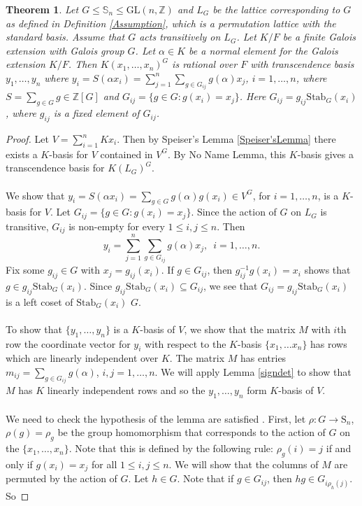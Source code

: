 \documentclass{article}
\theoremstyle{plain}
\newtheorem{theorem}{Theorem}
\theoremstyle{definition}
\newcommand{\Z}{\ensuremath{\mathbb{Z}}}
\begin{document}
\begin{theorem}
Let $G\leq \mathbb{S}_n \leq \mathrm{GL}(n,\Z)$ and $L_G$ be the lattice corresponding to $G$ as defined in Definition \ref{Assumption}, which is a permutation lattice with the standard basis. Assume that $G$ acts transitively on $L_G$. Let $K/F$ be a finite Galois extension with Galois group $G$. Let $\alpha \in K$ be a normal element for the Galois extension $K/F$. Then $ K(x_1,\ldots , x_n)^G$ is rational over $F$ with transcendence basis $y_1, \ldots , y_n$ where $y_i = S(\alpha x_i) = \sum^n_{j=1}\sum_{g \in G_{ij}}g(\alpha)x_j$, $i = 1, \ldots , n$, where $S = \sum_{g\in G} g \in \Z[G]$ and $G_{ij} = \lbrace g \in G : g(x_i) = x_j \rbrace$. Here $G_{ij}=g_{ij}\mathrm{Stab}_{G}(x_i)$, where $g_{ij}$ is a fixed element of $G_{ij}$. 
\end{theorem}
\begin{proof}
Let $V = \sum_{i=1}^n Kx_i$. Then by Speiser's Lemma \ref{Speiser'sLemma} there exists a $K$-basis for $V$ contained in $V^G$. By No Name Lemma, this $K$-basis gives a transcendence basis for $K(L_G)^G$.\\
\\
We show that $y_i = S(\alpha x_i) = \sum_{g \in G} g(\alpha)g(x_i) \in V^G$, for $i = 1, \ldots , n$, is a $K$-basis for $V$. Let $G_{ij}= \lbrace g \in G: g(x_i) = x_j \rbrace$. Since the action of $G$ on $L_G$ is transitive, $G_{ij}$ is non-empty for every $1 \leq i,j \leq n$. Then $$y_i = \sum^n_{j =1}\sum_{g \in G_{ij}}g(\alpha)x_j, \,\,\, i = 1, \ldots, n.$$
Fix some $g_{ij} \in G$ with $x_j = g_{ij}(x_i)$. If $g \in G_{ij}$, then $g^{-1}_{ij}g(x_i) = x_i$ shows that $g \in g_{ij}\mathrm{Stab}_G(x_i)$. Since  $g_{ij}\mathrm{Stab}_G(x_i) \subseteq G_{ij}$, we see that $G_{ij} = g_{ij}\mathrm{Stab}_G(x_i)$ is a left coset of $\mathrm{Stab}_G(x_i)$ $G$.\\
\\
To show that $\lbrace y_1, \ldots, y_n \rbrace$ is a $K$-basis of $V$, we show that the matrix $M$ with $i$th row the coordinate vector for $y_i$ with respect to the $K$-basis $\lbrace x_1, \ldots x_n \rbrace$ has rows which are linearly independent over $K$. The matrix $M$ has entries $m_{ij} = \sum_{g \in G_{ij}}g(\alpha)$, $i,j = 1, \ldots, n$. We will apply Lemma \ref{signdet} to show that $M$ has $K$ linearly independent  rows and so the $y_1, \ldots, y_n$ form $K$-basis of $V$.\\
\\
We need to check the hypothesis of the lemma are satisfied . First, let $\rho: G \longrightarrow \mathrm{S}_n$, $\rho(g) = \rho_g$ be the group homomorphism that corresponds to the action of $G$ on the $\lbrace x_1, \ldots , x_n \rbrace$. Note that this is defined by the following rule: $\rho_g(i) = j$ if and only if $g(x_i) = x_j$ for all $1 \leq i,j\leq n$. We will show that the columns of $M$ are permuted by the action of $G$. Let $h \in G$. Note that if $g \in G_{ij}$, then $hg \in G_{i\rho_h(j)}$. So 

\end{proof}
\end{document}
